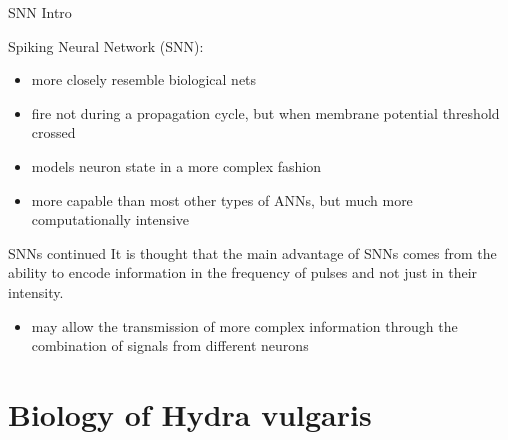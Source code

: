 \documentclass[leqno,presentation,unknownkeysallowed]{beamer}
\begin{document}
\begin{frame}{SNN Intro}

\begin{definition}
Spiking Neural Network (SNN):
\begin{itemize}
    \item more closely resemble biological nets
    \item fire not during a propagation cycle, but when membrane potential threshold crossed
    \item models neuron state in a more complex fashion
    \item more capable than most other types of ANNs, but much more computationally intensive
\end{itemize}
\end{definition}
\end{frame}

\begin{frame}{SNNs continued}
It is thought that the main advantage of SNNs comes from the ability to encode information in the frequency of pulses and not just in their intensity. 
\begin{itemize}
    \item may allow the transmission of more complex information through the combination of signals from different neurons
\end{itemize}
\end{frame}


\section{Biology of Hydra vulgaris}
\end{document}
